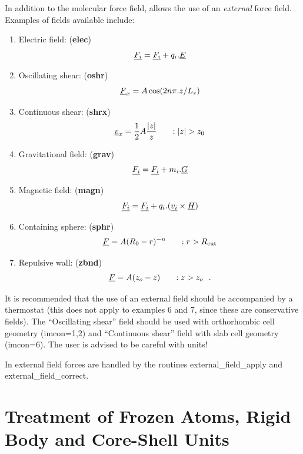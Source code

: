 In addition to the molecular force field, \D allows the use of an
{\em external} force field.  Examples of fields
available include:
\begin{enumerate}
\item Electric field:  ({\bf elec})
\begin{equation}
\mbox{$\underline{F_{i}}$} = \mbox{$\underline{F_{i}}$} + q_{i} . \mbox{$\underline{E}$}
\end {equation}
\item Oscillating shear:  ({\bf oshr})
\begin{equation}
\mbox{$\underline{F}$}_{x} =A \cos(2n \pi . z/L_{z})
\end{equation}
\item Continuous shear:  ({\bf shrx})
\begin{equation}
\vek{v}_{x} = \frac{1}{2} A \frac{|z|}{z}~~~~~:|z|>z_{0}
\end{equation}
\item Gravitational field:  ({\bf grav})
\begin{equation}
\mbox{$\underline{F_{i}}$} = \mbox{$\underline{F_{i}}$} + m_{i} . \mbox{$\underline{G}$}
\end {equation}
\item Magnetic field:  ({\bf magn})
\begin{equation}
\mbox{$\underline{F_{i}}$} = \mbox{$\underline{F_{i}}$} + q_{i} . (\mbox{$\underline{v_{i}}$} \times \mbox{$\underline{H}$})
\end {equation}
\item Containing sphere:  ({\bf sphr})
\begin{equation}
\mbox{$\underline{F}$}=A(R_{0}-r)^{-n}~~~~~: r>R_{\rm cut}
\end{equation}
\item Repulsive wall:  ({\bf zbnd})
\begin{equation}
\mbox{$\underline{F}$}=A(z_{o}-z)~~~~~: z>z_{o}~~.
\end{equation}
\end{enumerate}
It is recommended that the use of an external field should be
accompanied by a thermostat (this does not apply
to examples 6 and 7, since these are conservative fields).  The
``Oscillating shear'' field should be used with orthorhombic cell
geometry (imcon=1,2) and ``Continuous shear'' field with slab cell
geometry (imcon=6).  The user is advised to be careful with units!

In \D external field forces are
handled by the routines {\sc external\_field\_apply} and
{\sc external\_field\_correct}.

\section{Treatment of Frozen Atoms, Rigid Body and Core-Shell Units}

